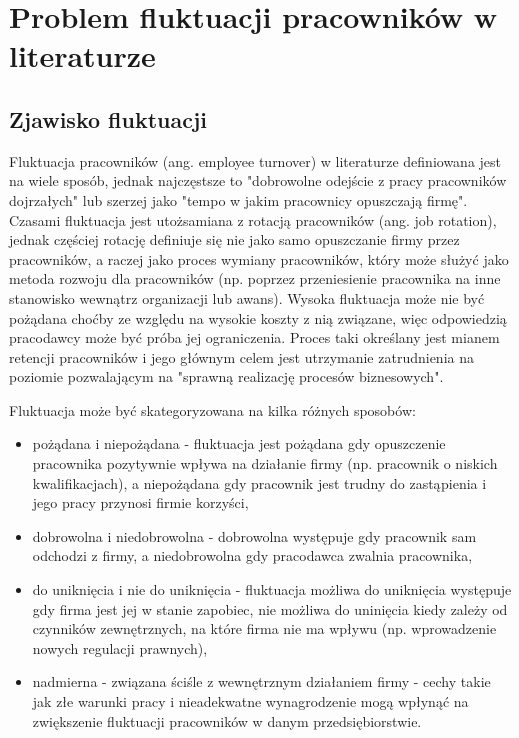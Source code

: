 

\chapter{Problem fluktuacji pracowników w literaturze}\label{ch:knowladge-state}


\section{Zjawisko fluktuacji}\label{sec:zjawisko-fluktuacji}
Fluktuacja pracowników (ang. employee turnover) w literaturze definiowana jest na wiele sposób, jednak najczęstsze to "dobrowolne odejście z pracy pracowników dojrzałych"\cite{wozniak-2016}
lub szerzej jako "tempo w jakim pracownicy opuszczają firmę"\cite{cron-2006}.
Czasami fluktuacja jest utożsamiana z rotacją pracowników (ang. job rotation),
jednak częściej rotację definiuje się nie jako samo opuszczanie firmy przez pracowników, a raczej jako proces wymiany pracowników,
który może służyć jako metoda rozwoju dla pracowników (np. poprzez przeniesienie pracownika na inne stanowisko wewnątrz organizacji lub awans)\cite{pocztowski-2009}.
Wysoka fluktuacja może nie być pożądana choćby ze względu na wysokie koszty z nią związane\cite{philips-edwards-2009},
więc odpowiedzią pracodawcy może być próba jej ograniczenia.
Proces taki określany jest mianem retencji pracowników i jego głównym celem jest utrzymanie zatrudnienia na poziomie pozwalającym na "sprawną realizację procesów biznesowych"\cite{pocztowski-2007}.

Fluktuacja może być skategoryzowana na kilka różnych sposobów\cite{spychala-2019}:
\begin{itemize}
    \item pożądana i niepożądana - fluktuacja jest pożądana gdy opuszczenie pracownika pozytywnie wpływa na działanie firmy (np. pracownik o niskich kwalifikacjach), a niepożądana gdy pracownik jest trudny do zastąpienia i jego pracy przynosi firmie korzyści,
    \item dobrowolna i niedobrowolna - dobrowolna występuje gdy pracownik sam odchodzi z firmy, a niedobrowolna gdy pracodawca zwalnia pracownika,
    \item do uniknięcia i nie do uniknięcia - fluktuacja możliwa do uniknięcia występuje gdy firma jest jej w stanie zapobiec, nie możliwa do uninięcia kiedy zależy od czynników zewnętrznych, na które firma nie ma wpływu (np. wprowadzenie nowych regulacji prawnych),
    \item nadmierna - związana ściśle z wewnętrznym działaniem firmy - cechy takie jak złe warunki pracy i nieadekwatne wynagrodzenie mogą wpłynąć na zwiększenie fluktuacji pracowników w danym przedsiębiorstwie.
\end{itemize}

